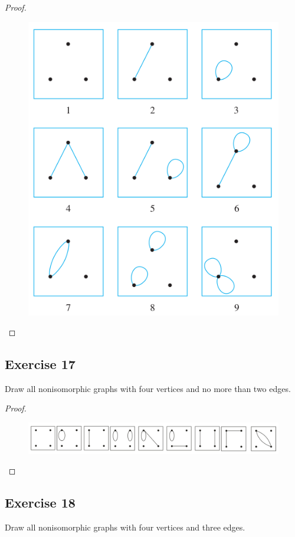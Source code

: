\documentclass[14pt]{extarticle}
\begin{document}
\begin{proof}
\begin{figure}[ht!]
\centering
\includegraphics[scale=0.4]{../images/10.3.16.png}
\end{figure}
\end{proof}

\subsection{Exercise 17}
Draw all nonisomorphic graphs with four vertices and no more than two edges.

\begin{proof}
\begin{figure}[ht!]
\centering
\includegraphics[scale=0.3]{../images/10.3.17.png}
\end{figure}
\end{proof}

\subsection{Exercise 18}
Draw all nonisomorphic graphs with four vertices and three edges.
\end{document}
